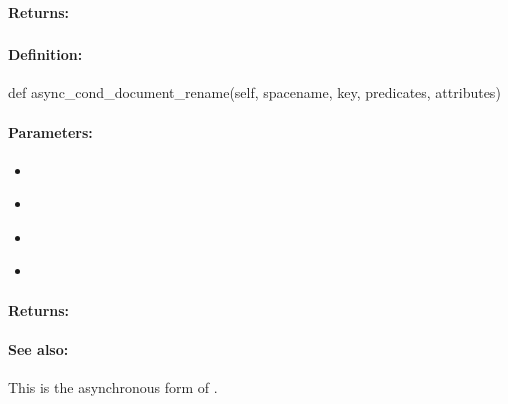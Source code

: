 \paragraph{Returns:}


\pagebreak
\subsubsection{}
\label{api:python:async_cond_document_rename}


\paragraph{Definition:}
\begin{pythoncode}
def async_cond_document_rename(self, spacename, key, predicates, attributes)
\end{pythoncode}

\paragraph{Parameters:}
\begin{itemize}[noitemsep]
\item {}\\

\item {}\\

\item {}\\

\item {}\\

\end{itemize}

\paragraph{Returns:}


\paragraph{See also:}  This is the asynchronous form of .

